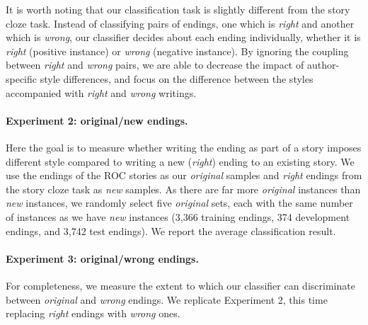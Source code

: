 \documentclass[11pt,a4paper]{article}
\newcommand{\resolved}[1]{}
\newcommand{\roy}[1]{{\color{orange}\textsc{[#1 --rs]}}}
\newcommand{\nascomment}[1]{{\color{blue}\textsc{[#1 --nas]}}}
\renewcommand{\roy}[1]{{\color{orange}[#1 --rs]}}
\renewcommand{\roy}[1]{#1}
\renewcommand{\nascomment}[1]{}
\begin{document}
It is worth noting that our classification task is slightly different from the story cloze task. 
Instead of classifying pairs of endings, one which is {\it right} and
another which is {\it wrong}, our classifier decides about each ending
individually, whether it is \emph{right} (positive instance) or
\emph{wrong} (negative instance).
By ignoring the coupling between {\it right} and {\it wrong} pairs, 
we are able to decrease the impact of author-specific style differences,
and focus on the difference between the styles accompanied with {\it right} and {\it wrong} writings.
\resolved{we
are able make a more general claim about the style used when writing
each of the tasks \nascomment{I'm not sure I follow this sentence; can
we be more clear?}.}

\paragraph{Experiment 2: original/new endings.}

Here the goal is to measure whether writing the ending as part of a
story imposes different style compared to writing a new ({\it right}) ending to an existing story.
We use the endings of the ROC stories as our {\it original} samples and {\it right} endings from the story cloze task   \resolved{\nascomment{if you're using the test examples as
  training data, what are you using for test? and development?  I would have thought
  you'd follow the same pattern as above ... }}as {\it new} samples.
As there are far more {\it original} instances than {\it new}
instances, we randomly select five  {\it original} sets, each with the same number of
instances  \resolved{\nascomment{(give the number in parentheses, for train/dev/test)} }as we have
\emph{new} instances (3,366 training endings, 374 development endings, and 3,742 test endings).
We report the average classification result.

\roy{\paragraph{Experiment 3: original/wrong endings.}
For completeness, we measure the extent to which our classifier can discriminate between {\it original} and {\it wrong} endings. We replicate Experiment 2, this time replacing {\it right} endings with {\it wrong} ones.}
\end{document}
